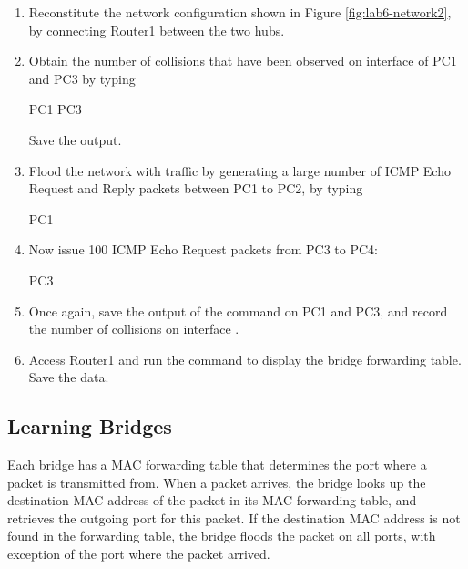 \begin{enumerate}
	\item Reconstitute the network configuration shown in Figure \ref{fig:lab6-network2}, by connecting Router1 between the two hubs.
	\item Obtain the number of collisions that have been observed on interface  of PC1 and PC3 by typing
		\begin{cmdblock}
	PC1%
	PC3%
		\end{cmdblock}
		Save the output.
	\item Flood the network with traffic by generating a large number of ICMP Echo Request and Reply packets between PC1 to PC2, by typing
		\begin{cmdblock}
	PC1%
		\end{cmdblock}
	\item Now issue 100 ICMP Echo Request packets from PC3 to PC4:
		\begin{cmdblock}
	PC3%
		\end{cmdblock}
	\item Once again, save the output of the command  on PC1 and PC3, and record the number of collisions on interface .
	\item Access Router1 and run the  command to display the bridge forwarding table. Save the data.
\end{enumerate}

\begin{questions}
\end{questions}

\newpage
\subsection{Learning Bridges}

Each bridge has a MAC forwarding table that determines the port where a packet is transmitted from. When a packet arrives, the bridge looks up the destination MAC address of the packet in its MAC forwarding table, and retrieves the outgoing port for this packet. If the destination MAC address is not found in the forwarding table, the bridge floods the packet on all ports, with exception of the port where the packet arrived.

